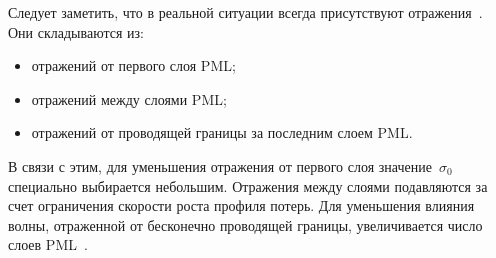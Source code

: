 
Следует заметить, что в реальной ситуации всегда присутствуют
отражения~\cite{bib:Berenger1994,bib:Berenger1996}.
Они складываются из:
\begin{itemize}
  \item отражений от первого слоя PML;
  \item отражений между слоями PML;
  \item отражений от проводящей границы за последним слоем PML.
\end{itemize}

\noindent
В связи с этим, для уменьшения отражения от первого слоя значение~$\sigma_0$
специально выбирается небольшим. Отражения между слоями подавляются за счет
ограничения скорости роста профиля потерь. Для уменьшения влияния волны,
отраженной от бесконечно проводящей границы, увеличивается число слоев
PML~\cite{bib:Berenger1996}.
